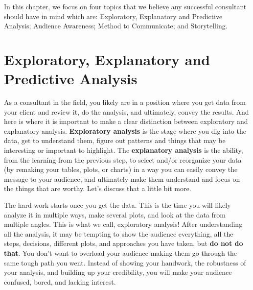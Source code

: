 \documentclass[
]{krantz}
\begin{document}
In this chapter, we focus on four topics that we believe any successful consultant should have in mind which are: Exploratory, Explanatory and Predictive Analysis; Audience Awareness; Method to Communicate; and Storytelling.

\hypertarget{exploratory-explanatory-and-predictive-analysis}{%
\section{Exploratory, Explanatory and Predictive Analysis}\label{exploratory-explanatory-and-predictive-analysis}}

As a consultant in the field, you likely are in a position where you get data from your client and review it, do the analysis, and ultimately, convey the results. And here is where it is important to make a clear distinction between exploratory and explanatory analysis. \textbf{Exploratory analysis} is the stage where you dig into the data, get to understand them, figure out patterns and things that may be interesting or important to highlight. The \textbf{explanatory analysis} is the ability, from the learning from the previous step, to select and/or reorganize your data (by remaking your tables, plots, or charts) in a way you can easily convey the message to your audience, and ultimately make them understand and focus on the things that are worthy. Let's discuss that a little bit more.

The hard work starts once you get the data. This is the time you will likely analyze it in multiple ways, make several plots, and look at the data from multiple angles. This is what we call, exploratory analysis! After understanding all the analysis, it may be tempting to show the audience everything, all the steps, decisions, different plots, and approaches you have taken, but \textbf{do not do that}. You don't want to overload your audience making them go through the same tough path you went. Instead of showing your handwork, the robustness of your analysis, and building up your credibility, you will make your audience confused, bored, and lacking interest.
\end{document}
